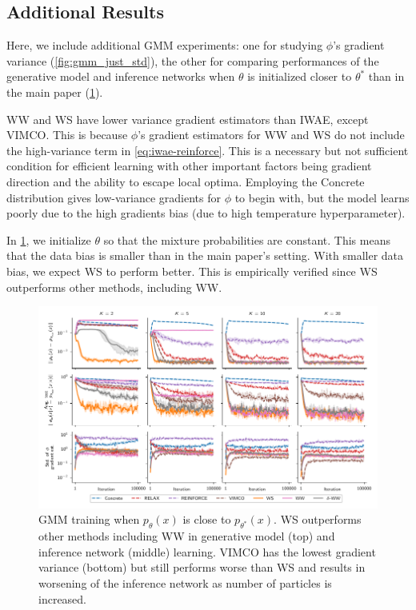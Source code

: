 \subsection{Additional Results}
\label{app:gmm/additional}

Here, we include additional \gls{GMM} experiments:
one for studying $\phi$'s gradient variance (\cref{fig:gmm_just_std}),
the other for comparing performances of the generative model and inference networks when $\theta$ is initialized closer to $\theta^*$ than in the main paper (\cref{fig:gmm_init_near}).

\Gls{WW} and \gls{WS} have lower variance gradient estimators than \gls{IWAE}, except \gls{VIMCO}.
%
This is because $\phi$'s gradient estimators for \gls{WW} and \gls{WS} do not include the high-variance term  in \cref{eq:iwae-reinforce}.
%
This is a necessary but not sufficient condition for efficient learning with other important factors being gradient direction and the ability to escape local optima.
%
Employing the Concrete distribution gives low-variance gradients for $\phi$ to begin with, but the model learns poorly due to the high gradients bias (due to high temperature hyperparameter).

In \cref{fig:gmm_init_near}, we initialize $\theta$ so that the mixture probabilities are constant.
This means that the data bias is smaller than in the main paper's setting.
With smaller data bias, we expect \gls{WS} to perform better.
This is empirically verified since \gls{WS} outperforms other methods, including \gls{WW}.


\begin{figure}[!ht]
  \centering
  \includegraphics[width=\textwidth]{figures/RRWS/gmm/errors_near.pdf}
  \vspace*{-4ex}
  \caption{
    \Gls{GMM} training when $p_\theta(x)$ is close to $p_{\theta^*}(x)$.
    \Gls{WS} outperforms other methods including \gls{WW} in generative model (top) and inference network (middle) learning.
    \Gls{VIMCO} has the lowest gradient variance (bottom) but still performs worse than \gls{WS} and results in worsening of the inference network as number of particles is increased.
  }
  \label{fig:gmm_init_near}
  \vspace*{-2ex}
\end{figure}

